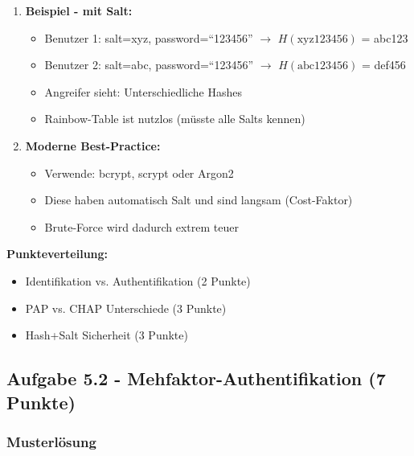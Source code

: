 \documentclass[12pt,a4paper]{article}
\begin{document}
\begin{tcolorbox}[colback=solutionbg, colframe=black!30]
\begin{enumerate}[1.]
    \item \textbf{Beispiel - mit Salt:}
    \begin{itemize}
        \item Benutzer 1: salt=xyz, password=``123456'' $\to$ $H(\text{xyz123456})$ = abc123
        \item Benutzer 2: salt=abc, password=``123456'' $\to$ $H(\text{abc123456})$ = def456
        \item Angreifer sieht: Unterschiedliche Hashes
        \item Rainbow-Table ist nutzlos (müsste alle Salts kennen)
    \end{itemize}
    
    \item \textbf{Moderne Best-Practice:}
    \begin{itemize}
        \item Verwende: bcrypt, scrypt oder Argon2
        \item Diese haben automatisch Salt und sind langsam (Cost-Faktor)
        \item Brute-Force wird dadurch extrem teuer
    \end{itemize}
\end{enumerate}

\end{tcolorbox}

\textbf{Punkteverteilung:}
\begin{itemize}
    \item Identifikation vs. Authentifikation (2 Punkte) \checkmark
    \item PAP vs. CHAP Unterschiede (3 Punkte) \checkmark
    \item Hash+Salt Sicherheit (3 Punkte) \checkmark
\end{itemize}

\subsection{Aufgabe 5.2 - Mehfaktor-Authentifikation (7 Punkte)}

\subsubsection*{Musterlösung}
\end{document}
